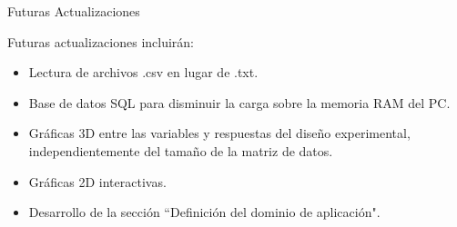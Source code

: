 \begin{frame}[t]{Futuras Actualizaciones}\vspace{10pt}

Futuras actualizaciones incluir\'an:

\begin{itemize}
	\item Lectura de archivos .csv en lugar de .txt.
	\item Base de datos SQL para disminuir la carga sobre la memoria RAM del PC.
	\item Gr\'aficas 3D entre las variables y respuestas del dise\~no experimental, independientemente del tama\~no de la matriz de datos.
	\item Gr\'aficas 2D interactivas.
	\item Desarrollo de la secci\'on ``Definici\'on del dominio de aplicaci\'on".
\end{itemize}

\end{frame}